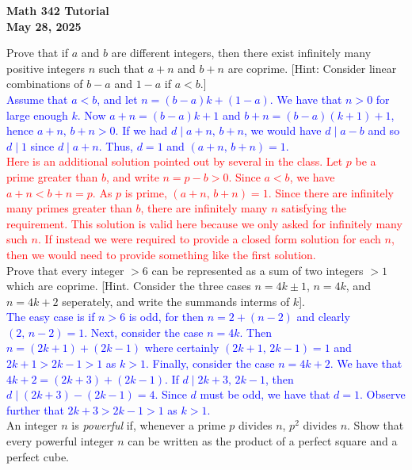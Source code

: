 \documentclass[a4paper,11pt]{article}
\theoremstyle{mythm}
\theoremstyle{mydef}
\newcommand{\red}[1]{\textcolor{red}{#1}}
\newcommand{\blue}[1]{\textcolor{blue}{#1}}
\begin{document}
\begin{center}
  {\Large\bfseries Math 342 Tutorial} \\
  {\normalsize\bf May 28, 2025}
\end{center}

 Prove that if $a$ and $b$ are different integers,
then there exist infinitely many positive integers $n$ such that $a+n$ and $b+n$
are coprime. [Hint: Consider linear combinations of $b-a$ and $1-a$ if $a<b$.] \\

\blue{Assume that $a<b$, and let $n=(b-a)k+(1-a)$. We have that $n>0$ for large
  enough $k$. Now $a+n=(b-a)k+1$ and $b+n=(b-a)(k+1)+1$, hence $a+n,\,b+n > 0$.
  If we had $d \mid a+n,\,b+n$, we would have $d \mid a-b$ and so $d \mid 1$
  since $d \mid a+n$. Thus, $d=1$ and $(a+n,\,b+n)=1$.} \\

\red{Here is an additional solution pointed out by several in the class. Let $p$
be a prime greater than $b$, and write $n=p-b > 0$. Since $a<b$, we have $a+n <
b+n=p$. As $p$ is prime, $(a+n,\,b+n)=1$. Since there are infinitely many primes
greater than $b$, there are infinitely many $n$ satisfying the requirement. This
solution is valid here because we only asked for infinitely many such $n$. If
instead we were required to provide a closed form solution for each $n$, then we
would need to provide something like the first solution.} \\

 Prove that every integer $>6$ can be represented as a
sum of two integers $>1$ which are coprime. [Hint. Consider the three cases
$n=4k \pm 1$, $n=4k$, and $n=4k+2$ seperately, and write the summands interms of
$k$]. \\

\blue{The easy case is if $n>6$ is odd, for then $n=2+(n-2)$ and clearly
  $(2,\,n-2)=1$. Next, consider the case $n=4k$. Then $n=(2k+1)+(2k-1)$ where
  certainly $(2k+1,\,2k-1)=1$ and $2k+1 > 2k-1 > 1$ as $k>1$. Finally, consider
  the case $n=4k+2$. We have that $4k+2=(2k+3)+(2k-1)$. If $d \mid 2k+3,\,2k-1$,
  then $d \mid (2k+3)-(2k-1)=4$. Since $d$ must be odd, we have that $d=1$.
  Observe further that $2k+3>2k-1>1$ as $k>1$.} \\

 An integer $n$ is {\it powerful} if, whenever a prime
$p$ divides $n$, $p^2$ divides $n$. Show that every powerful integer $n$ can be
written as the product of a perfect square and a perfect cube. \\
\end{document}
